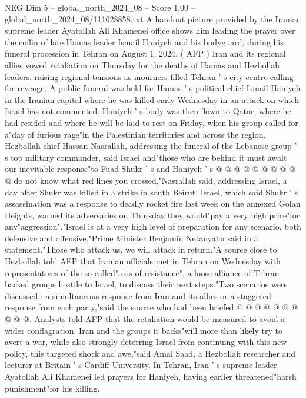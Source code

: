 \begin{textsample}{NEG Dim 5 – global\_north\_2024\_08 – Score 1.00 – global\_north\_2024\_08/111628858.txt}  \label{ex:f5_neg_077}
A handout picture provided by the Iranian supreme leader Ayatollah Ali Khamenei office shows him leading the prayer over the coffin of late Hamas leader Ismail Haniyeh and his bodyguard, during his funeral procession in Tehran on August 1, 2024. ( AFP ) Iran and its regional allies vowed retaliation on Thursday for the deaths of Hamas and Hezbollah leaders, raising regional tensions as mourners filled Tehran ' s city centre calling for revenge.
A public funeral was held for Hamas ' s political chief Ismail Haniyeh in the Iranian capital where he was killed early Wednesday in an attack on which Israel has not commented.
Haniyeh ' s body was then flown to Qatar, where he had resided and where he will be laid to rest on Friday, when his group called for a"day of furious rage"in the Palestinian territories and across the region.
Hezbollah chief Hassan Nasrallah, addressing the funeral of the Lebanese group ' s top military commander, said Israel and"those who are behind it must await our inevitable response"to Fuad Shukr ' s and Haniyeh ' s @ @ @ @ @ @ @ @ @ @ do not know what red lines you crossed,"Nasrallah said, addressing Israel, a day after Shukr was killed in a strike in south Beirut.
Israel, which said Shukr ' s assassination was a response to deadly rocket fire last week on the annexed Golan Heights, warned its adversaries on Thursday they would"pay a very high price"for any"aggression"."Israel is at a very high level of preparation for any scenario, both defensive and offensive,"Prime Minister Benjamin Netanyahu said in a statement."Those who attack us, we will attack in return."A source close to Hezbollah told AFP that Iranian officials met in Tehran on Wednesday with representatives of the so-called"axis of resistance", a loose alliance of Tehran-backed groups hostile to Israel, to discuss their next steps."Two scenarios were discussed : a simultaneous response from Iran and its allies or a staggered response from each party,"said the source who had been briefed @ @ @ @ @ @ @ @ @ @.
Analysts told AFP that the retaliation would be measured to avoid a wider conflagration.
Iran and the groups it backs"will more than likely try to avert a war, while also strongly deterring Israel from continuing with this new policy, this targeted shock and awe,"said Amal Saad, a Hezbollah researcher and lecturer at Britain ' s Cardiff University.
In Tehran, Iran ' s supreme leader Ayatollah Ali Khamenei led prayers for Haniyeh, having earlier threatened"harsh punishment"for his killing.

\end{textsample}
